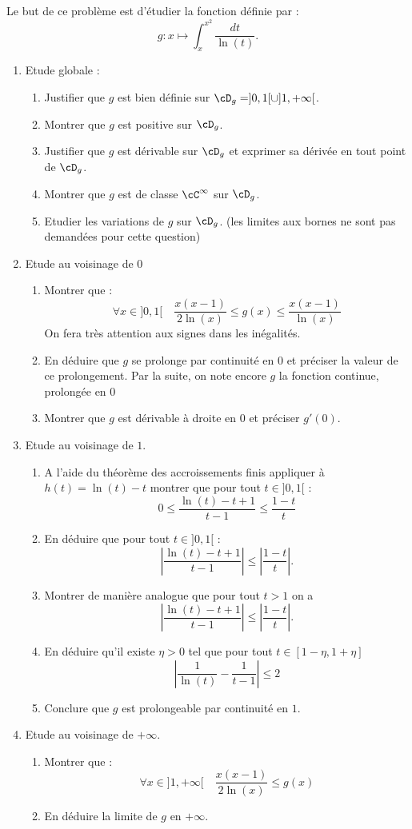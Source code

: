 \begin{exercice}
Le but de ce problème est d'étudier la fonction définie par : 
$$g : x \mapsto \int_x^{x^2} \frac{dt}{\ln(t)}.$$
\begin{enumerate}
\item Etude globale : 
\begin{enumerate}
\item Justifier que $g$ est bien définie sur $\cD_g = ]0,1[\cup ]1,+\infty[$. 
\item Montrer que $g$ est positive sur $\cD_g$. 
\item Justifier que $g$ est dérivable sur $\cD_g$  et exprimer sa dérivée en tout point de $\cD_g$. 
\item Montrer que $g$ est de classe $\cC^\infty$ sur $\cD_g$. 
\item Etudier les variations de $g$ sur $\cD_g$. (les limites aux bornes ne sont pas demandées pour cette question) 
\end{enumerate}
\item Etude au voisinage de $0$
\begin{enumerate}
\item Montrer que :
$$\forall x\in ]0,1[\quad \frac{x(x-1)}{2\ln(x)}\leq g(x)\leq \frac{x(x-1)}{\ln(x)}$$
On fera très attention aux signes dans les inégalités. 
\item En déduire que $g$ se prolonge par continuité en $0$ et préciser la valeur de ce prolongement. 
Par la suite, on note encore $g$ la fonction continue, prolongée en $0$
\item Montrer que $g$ est dérivable à droite en $0$ et préciser $g'(0)$. 
\end{enumerate}
\item Etude au voisinage de $1$.
\begin{enumerate}
\item A l'aide du théorème des accroissements finis appliquer à $h(t) =\ln(t) -t$ montrer que pour tout $t\in ]0,1[ $ :
$$0\leq \frac{\ln(t) - t+ 1 }{t-1}\leq \frac{1-t}{t} $$
\item En déduire que pour tout $t\in ]0,1[ $ :
$$\left|\frac{\ln(t) - t+ 1 }{t-1}\right|\leq \left|\frac{1-t}{t}\right|.$$
\item Montrer de manière analogue que pour tout $t>1$ on  a
$$\left|\frac{\ln(t) - t+ 1 }{t-1}\right|\leq \left|\frac{1-t}{t}\right|.$$

\item En déduire qu'il existe $\eta >0 $ tel que pour tout $t  \in [1-\eta, 1+\eta]$ 
$$\left|\frac{1}{\ln(t)} -\frac{1}{t-1}\right|\leq 2$$
\item Conclure  que $g$  est prolongeable par continuité en $1$. 
\end{enumerate}

\item Etude au voisinage de $+\infty$.
\begin{enumerate}
\item Montrer que :
$$\forall x\in ]1,+\infty[\quad \frac{x(x-1)}{2\ln(x)}\leq g(x)$$
\item En déduire la limite de $g$ en $+\infty$. 
\end{enumerate}
\end{enumerate}
\end{exercice}
